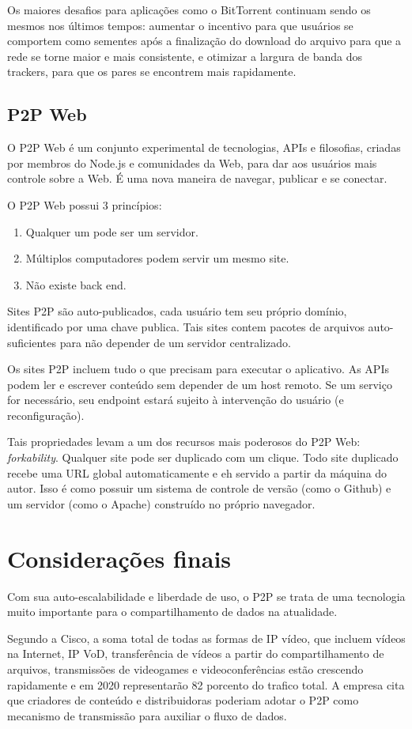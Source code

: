 \documentclass[a4paper]{article}
\begin{document}
Os maiores desafios para aplicações como o BitTorrent continuam sendo os mesmos nos últimos tempos: aumentar o incentivo para que usuários se comportem como sementes após a finalização do download do arquivo para que a rede se torne maior e mais consistente,  e otimizar a largura de banda dos trackers, para que os pares se encontrem mais rapidamente.

\subsection{P2P Web}
O P2P Web é um conjunto experimental de tecnologias, APIs e filosofias, criadas por membros do Node.js e comunidades da Web, para dar aos usuários mais controle sobre a Web. É uma nova maneira de navegar, publicar e se conectar.\cite{paul2016}

O P2P Web possui 3 princípios:\cite{paul2016}
\begin{enumerate}
	\item Qualquer um pode ser um servidor.
	\item Múltiplos computadores podem servir um mesmo site.
	\item Não existe back end.
\end{enumerate}

Sites P2P são auto-publicados, cada usuário tem seu próprio domínio, identificado por uma chave publica. Tais sites contem pacotes de arquivos auto-suficientes para não depender de um servidor centralizado.\cite{paul2016}

Os sites P2P incluem tudo o que precisam para executar o aplicativo. As APIs podem ler e escrever conteúdo sem depender de um host remoto. Se um serviço for necessário, seu endpoint estará sujeito à intervenção do usuário (e reconfiguração).\cite{paul2016}

Tais propriedades levam a um dos recursos mais poderosos do P2P Web: \textit{forkability}. Qualquer site pode ser duplicado com um clique. Todo site duplicado recebe uma URL global automaticamente e eh servido a partir da máquina do autor. Isso é como possuir um sistema de controle de versão (como o Github) e um servidor (como o Apache) construído no próprio navegador. \cite{paul2016}

\section{Considerações finais}
Com sua auto-escalabilidade e liberdade de uso, o P2P se trata de uma tecnologia muito importante para o compartilhamento de dados na atualidade.

Segundo a Cisco, a soma total de todas as formas de IP vídeo, que incluem vídeos na Internet, IP VoD, transferência de vídeos a partir do compartilhamento de arquivos, transmissões de videogames e videoconferências estão crescendo rapidamente e em 2020 representarão 82 porcento do trafico total. A empresa cita que criadores de conteúdo e distribuidoras poderiam adotar o P2P como mecanismo de transmissão para auxiliar o fluxo de dados.\cite{cisco}



\end{document}
